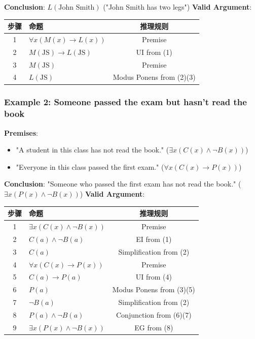 \documentclass[10pt,a4paper,openany]{ctexbook}
\theoremstyle{definition}
\theoremstyle{remark}
\begin{document}
\textbf{Conclusion}: $L(\text{John Smith})$ ("John Smith has two legs")
\textbf{Valid Argument}:
\begin{center}
\begin{tabular}{clc}
\hline
步骤 & 命题 & 推理规则 \\ \hline
1 & $\forall x (M(x) \to L(x))$ & Premise \\
2 & $M(\text{JS}) \to L(\text{JS})$ & UI from (1) \\
3 & $M(\text{JS})$ & Premise \\
4 & $L(\text{JS})$ & Modus Ponens from (2)(3) \\
\hline
\end{tabular}

\end{center}

\subsubsection{Example 2: Someone passed the exam but hasn't read the book}

\textbf{Premises}:
\begin{itemize}
\item "A student in this class has not read the book." ($\exists x (C(x) \land \neg B(x))$)
\item "Everyone in this class passed the first exam." ($\forall x (C(x) \to P(x))$)

\end{itemize}

\textbf{Conclusion}: "Someone who passed the first exam has not read the book." ($\exists x (P(x) \land \neg B(x))$)
\textbf{Valid Argument}:
\begin{center}
\begin{tabular}{clc}
\hline
步骤 & 命题 & 推理规则 \\ \hline
1 & $\exists x (C(x) \land \neg B(x))$ & Premise \\
2 & $C(a) \land \neg B(a)$ & EI from (1) \\
3 & $C(a)$ & Simplification from (2) \\
4 & $\forall x (C(x) \to P(x))$ & Premise \\
5 & $C(a) \to P(a)$ & UI from (4) \\
6 & $P(a)$ & Modus Ponens from (3)(5) \\
7 & $\neg B(a)$ & Simplification from (2) \\
8 & $P(a) \land \neg B(a)$ & Conjunction from (6)(7) \\
9 & $\exists x (P(x) \land \neg B(x))$ & EG from (8) \\
\hline
\end{tabular}

\end{center}
\end{document}
